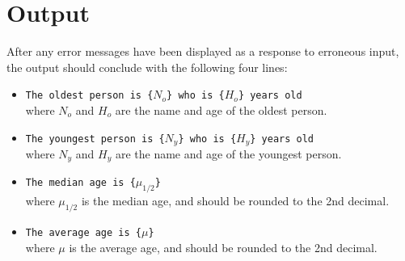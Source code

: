\section*{Output}
After any error messages have been displayed as a response to erroneous input,
the output should conclude with the following four lines:
\begin{itemize}
    \item
    \texttt{The oldest person is \{$N_o$\} who is \{$H_o$\} years old}\\
    where $N_o$ and $H_o$ are the name and age of the oldest person.

    \item
    \texttt{The youngest person is \{$N_y$\} who is \{$H_y$\} years old}\\
    where $N_y$ and $H_y$ are the name and age of the youngest person.

    \item
    \texttt{The median age is \{$\mu_{1/2}$\}}\\
    where $\mu_{1/2}$ is the median age, and should be rounded to the 2nd decimal.

    \item
    \texttt{The average age is \{$\mu$\}}\\
    where $\mu$ is the average age, and should be rounded to the 2nd decimal.
\end{itemize}
